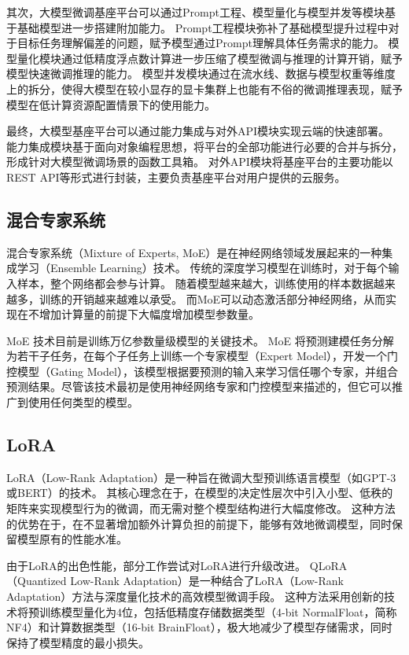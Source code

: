 其次，大模型微调基座平台可以通过Prompt工程、模型量化与模型并发等模块基于基础模型进一步搭建附加能力。
Prompt工程模块弥补了基础模型提升过程中对于目标任务理解偏差的问题，赋予模型通过Prompt理解具体任务需求的能力。
模型量化模块通过低精度浮点数计算进一步压缩了模型微调与推理的计算开销，赋予模型快速微调推理的能力。
模型并发模块通过在流水线、数据与模型权重等维度上的拆分，使得大模型在较小显存的显卡集群上也能有不俗的微调推理表现，赋予模型在低计算资源配置情景下的使用能力。

最终，大模型基座平台可以通过能力集成与对外API模块实现云端的快速部署。
能力集成模块基于面向对象编程思想，将平台的全部功能进行必要的合并与拆分，形成针对大模型微调场景的函数工具箱。
对外API模块将基座平台的主要功能以REST API等形式进行封装，主要负责基座平台对用户提供的云服务。

\subsection{混合专家系统}

混合专家系统（Mixture of Experts, MoE）是在神经网络领域发展起来的一种集成学习（Ensemble Learning）技术。
传统的深度学习模型在训练时，对于每个输入样本，整个网络都会参与计算。
随着模型越来越大，训练使用的样本数据越来越多，训练的开销越来越难以承受。
而MoE可以动态激活部分神经网络，从而实现在不增加计算量的前提下大幅度增加模型参数量。

MoE 技术目前是训练万亿参数量级模型的关键技术。
MoE 将预测建模任务分解为若干子任务，在每个子任务上训练一个专家模型（Expert Model），开发一个门控模型（Gating Model），该模型根据要预测的输入来学习信任哪个专家，并组合预测结果。尽管该技术最初是使用神经网络专家和门控模型来描述的，但它可以推广到使用任何类型的模型。

\subsection{LoRA}

LoRA（Low-Rank Adaptation）是一种旨在微调大型预训练语言模型（如GPT-3或BERT）的技术。
其核心理念在于，在模型的决定性层次中引入小型、低秩的矩阵来实现模型行为的微调，而无需对整个模型结构进行大幅度修改。
这种方法的优势在于，在不显著增加额外计算负担的前提下，能够有效地微调模型，同时保留模型原有的性能水准。

由于LoRA的出色性能，部分工作尝试对LoRA进行升级改进。
QLoRA（Quantized Low-Rank Adaptation）是一种结合了LoRA（Low-Rank Adaptation）方法与深度量化技术的高效模型微调手段。
这种方法采用创新的技术将预训练模型量化为4位，包括低精度存储数据类型（4-bit NormalFloat，简称NF4）和计算数据类型（16-bit BrainFloat），极大地减少了模型存储需求，同时保持了模型精度的最小损失。

